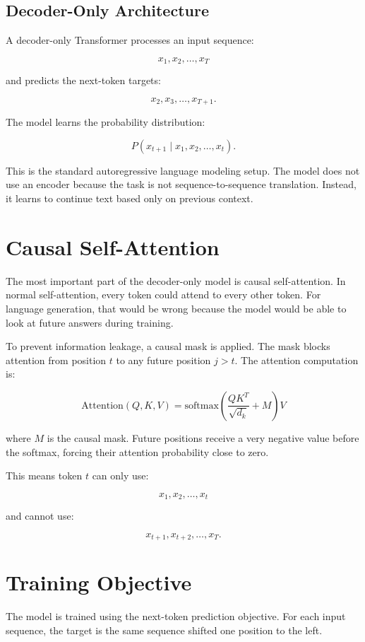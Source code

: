 \documentclass[11pt]{article}
\begin{document}
\subsection{Decoder-Only Architecture}

A decoder-only Transformer processes an input sequence:

\[
    x_1, x_2, \dots, x_T
\]

and predicts the next-token targets:

\[
    x_2, x_3, \dots, x_{T+1}.
\]

The model learns the probability distribution:

\[
    P(x_{t+1} \mid x_1, x_2, \dots, x_t).
\]

This is the standard autoregressive language modeling setup. The model does not use an encoder because the task is not sequence-to-sequence translation. Instead, it learns to continue text based only on previous context.

\section{Causal Self-Attention}

The most important part of the decoder-only model is causal self-attention. In normal self-attention, every token could attend to every other token. For language generation, that would be wrong because the model would be able to look at future answers during training.

To prevent information leakage, a causal mask is applied. The mask blocks attention from position \(t\) to any future position \(j > t\). The attention computation is:

\[
    \text{Attention}(Q,K,V) = \text{softmax}\left(\frac{QK^T}{\sqrt{d_k}} + M\right)V
\]

where \(M\) is the causal mask. Future positions receive a very negative value before the softmax, forcing their attention probability close to zero.

This means token \(t\) can only use:

\[
    x_1, x_2, \dots, x_t
\]

and cannot use:

\[
    x_{t+1}, x_{t+2}, \dots, x_T.
\]

\section{Training Objective}

The model is trained using the next-token prediction objective. For each input sequence, the target is the same sequence shifted one position to the left.
\end{document}
